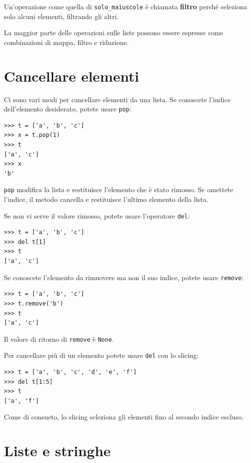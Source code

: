 \documentclass[10pt]{book}
\begin{document}
Un'operazione come quella di \verb"solo_maiuscole" è chiamata {\bf filtro} perché seleziona solo alcuni elementi, filtrando gli altri.

La maggior parte delle operazioni sulle liste possono essere espresse come combinazioni di mappa, filtro e riduzione.

\section{Cancellare elementi}

Ci sono vari modi per cancellare elementi da una lista. Se conoscete l'indice dell'elemento desiderato, potete usare
{\tt pop}:

\begin{verbatim}
>>> t = ['a', 'b', 'c']
>>> x = t.pop(1)
>>> t
['a', 'c']
>>> x
'b'
\end{verbatim}
%
{\tt pop} modifica la lista e restituisce l'elemento che è stato rimosso. Se omettete l'indice, il metodo cancella e restituisce l'ultimo elemento della lista.

Se non vi serve il valore rimosso, potete usare l'operatore {\tt del}:

\begin{verbatim}
>>> t = ['a', 'b', 'c']
>>> del t[1]
>>> t
['a', 'c']
\end{verbatim}
%

Se conoscete l'elemento da rimuovere ma non il suo indice, potete usare {\tt remove}:

\begin{verbatim}
>>> t = ['a', 'b', 'c']
>>> t.remove('b')
>>> t
['a', 'c']
\end{verbatim}
%
Il valore di ritorno di {\tt remove} è {\tt None}.

Per cancellare più di un elemento potete usare {\tt del} con lo slicing:

\begin{verbatim}
>>> t = ['a', 'b', 'c', 'd', 'e', 'f']
>>> del t[1:5]
>>> t
['a', 'f']
\end{verbatim}
%
Come di consueto, lo slicing seleziona gli elementi fino al secondo indice escluso.

\section{Liste e stringhe}
\end{document}
